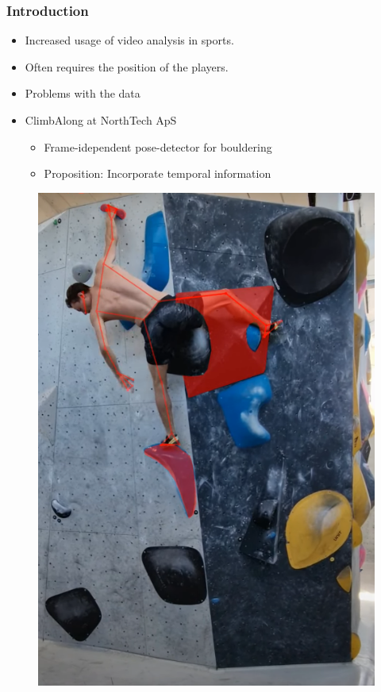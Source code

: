 \documentclass{beamer}
\begin{document}
\begin{frame}
    \frametitle{Introduction}
    \begin{minipage}{0.5\textwidth}
        \begin{itemize}
            \item<1-> Increased usage of video analysis in sports.
            \item<1-> Often requires the position of the players.
            \item<1-> Problems with the data
            \item<1-> ClimbAlong at NorthTech ApS
            \begin{itemize}
                \item<1-> Frame-idependent pose-detector for bouldering 
                \item<2-> Proposition: Incorporate temporal information
            \end{itemize}
        \end{itemize}
    \end{minipage} \hfill
    \begin{minipage}{0.45\textwidth}
        \begin{figure}
            \center
            \includegraphics[width = \textwidth]{./entities/ClimbAlong_cv.PNG}
        \end{figure}
    \end{minipage}
\end{frame}
\end{document}
